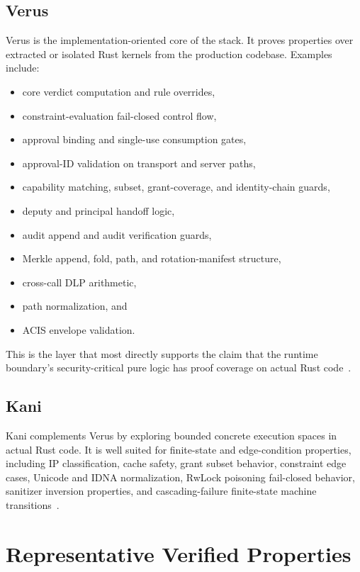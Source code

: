 \documentclass[11pt]{article}
\begin{document}
\subsection{Verus}

Verus is the implementation-oriented core of the stack. It proves properties
over extracted or isolated Rust kernels from the production codebase. Examples
include:

\begin{itemize}[leftmargin=*]
\item core verdict computation and rule overrides,
\item constraint-evaluation fail-closed control flow,
\item approval binding and single-use consumption gates,
\item approval-ID validation on transport and server paths,
\item capability matching, subset, grant-coverage, and identity-chain guards,
\item deputy and principal handoff logic,
\item audit append and audit verification guards,
\item Merkle append, fold, path, and rotation-manifest structure,
\item cross-call DLP arithmetic,
\item path normalization, and
\item ACIS envelope validation.
\end{itemize}

This is the layer that most directly supports the claim that the runtime
boundary's security-critical pure logic has proof coverage on actual Rust
code~\cite{verus,vellavetoFormalInventory}.

\subsection{Kani}

Kani complements Verus by exploring bounded concrete execution spaces in actual
Rust code. It is well suited for finite-state and edge-condition properties,
including IP classification, cache safety, grant subset behavior, constraint
edge cases, Unicode and IDNA normalization, RwLock poisoning fail-closed
behavior, sanitizer inversion properties, and cascading-failure finite-state
machine transitions~\cite{kani,vellavetoFormalInventory}.

\section{Representative Verified Properties}
\end{document}

